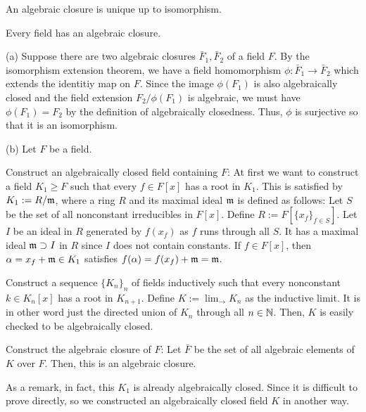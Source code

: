 \documentclass{../../large}
\begin{document}
\begin{prb}
\begin{parts}
\item An algebraic closure is unique up to isomorphism.
\item Every field has an algebraic closure.
\end{parts}
\end{prb}
\begin{pf}
(a)
Suppose there are two algebraic closures $\bar F_1, \bar F_2$ of a field $F$.
By the isomorphism extension theorem, we have a field homomorphism $\phi:\bar F_1\to\bar F_2$ which extends the identitiy map on $F$.
Since the image $\phi(F_1)$ is also algebraically closed and the field extension $F_2/\phi(F_1)$ is algebraic, we must have $\phi(F_1)=F_2$ by the definition of algebraically closedness.
Thus, $\phi$ is surjective so that it is an isomorphism.

(b)
Let $F$ be a field.

Construct an algebraically closed field containing $F$:
At first we want to construct a field $K_1\ge F$ such that every $f\in F[x]$ has a root in $K_1$.
This is satisfied by $K_1:=R/\mathfrak{m}$, where a ring $R$ and its maximal ideal $\mathfrak{m}$ is defined as follows:
Let $S$ be the set of all nonconstant irreducibles in $F[x]$.
Define $R:=F[\{x_f\}_{f\in S}]$.
Let $I$ be an ideal in $R$ generated by $f(x_f)$ as $f$ runs through all $S$.
It has a maximal ideal $\mathfrak{m}\supset I$ in $R$ since $I$ does not contain constants.
If $f\in F[x]$, then $\alpha=x_f+\mathfrak{m}\in K_1$ satisfies $f(\alpha)=f(x_f)+\mathfrak{m}=\mathfrak{m}$.

Construct a sequence $\{K_n\}_n$ of fields inductively such that every nonconstant $k\in K_n[x]$ has a root in $K_{n+1}$.
Define $K:=\lim_{\to}K_n$ as the inductive limit.
It is in other word just the directed union of $K_n$ through all $n\in\mathbb{N}$.
Then, $K$ is easily checked to be algebraically closed.

Construct the algebraic closure of $F$:
Let $\bar F$ be the set of all algebraic elements of $K$ over $F$.
Then, this is an algebraic closure.


As a remark, in fact, this $K_1$ is already algebraically closed.
Since it is difficult to prove directly, so we constructed an algebraically closed field $K$ in another way.
\end{pf}
\end{document}
